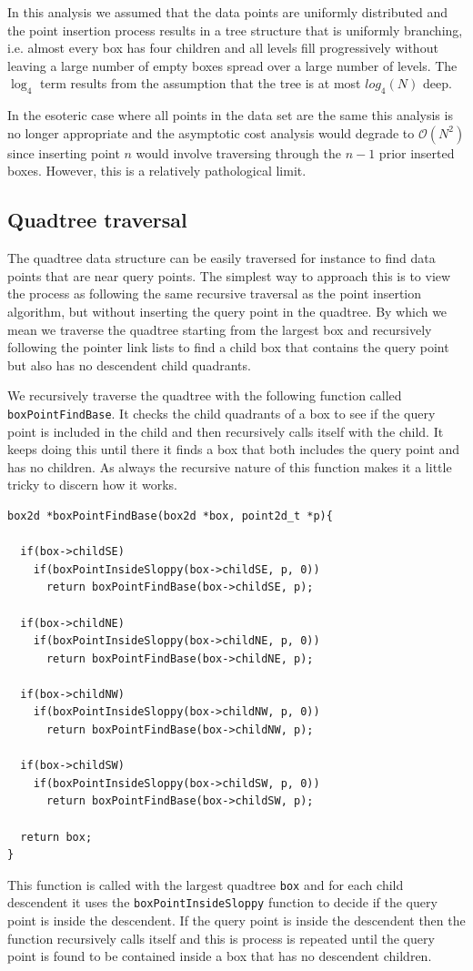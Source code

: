 In this analysis we assumed that the data points are uniformly distributed and the point insertion process results in a tree structure that is uniformly branching, i.e. almost every box has four children and all levels fill progressively without leaving a large number of empty boxes spread over a large number of levels. The $\log_4$ term results from the assumption that the tree is at most $log_4(N)$ deep. 

In the esoteric case where all points in the data set are the same this analysis is no longer appropriate and the asymptotic cost analysis would degrade to $\mathcal{O}(N^2)$ since inserting point $n$ would involve traversing through the $n-1$ prior inserted boxes. However, this is a relatively pathological limit.

\subsection{Quadtree traversal}

The quadtree data structure can be easily traversed for instance to find data points that are near query points. The simplest way to approach this is to view the process as following the same recursive traversal as the point insertion algorithm, but without inserting the query point in the quadtree. By which we mean we traverse the quadtree starting from the largest box and recursively following the pointer link lists to find a child box that contains the query point but also has no descendent child quadrants. 

We recursively traverse the quadtree with the following function called \texttt{boxPointFindBase}. It checks the child quadrants of a box to see if the query point is included in the child and then recursively calls itself with the child. It keeps doing this until there it finds a box that both includes the query point and has no children. As always the recursive nature of this function makes it a little tricky to discern how it works.
\begin{verbatim}
box2d *boxPointFindBase(box2d *box, point2d_t *p){

  if(box->childSE)
    if(boxPointInsideSloppy(box->childSE, p, 0))
      return boxPointFindBase(box->childSE, p);

  if(box->childNE)
    if(boxPointInsideSloppy(box->childNE, p, 0))
      return boxPointFindBase(box->childNE, p);

  if(box->childNW)
    if(boxPointInsideSloppy(box->childNW, p, 0))
      return boxPointFindBase(box->childNW, p);

  if(box->childSW)
    if(boxPointInsideSloppy(box->childSW, p, 0))
      return boxPointFindBase(box->childSW, p);

  return box;
}
\end{verbatim}
This function is called with the largest quadtree \texttt{box} and for each child descendent it uses the \texttt{boxPointInsideSloppy} function to decide if the query point is inside the descendent. If the query point is inside the descendent then the function recursively calls itself and this is process is repeated until the query point is found to be contained inside a box that has no descendent children. 

